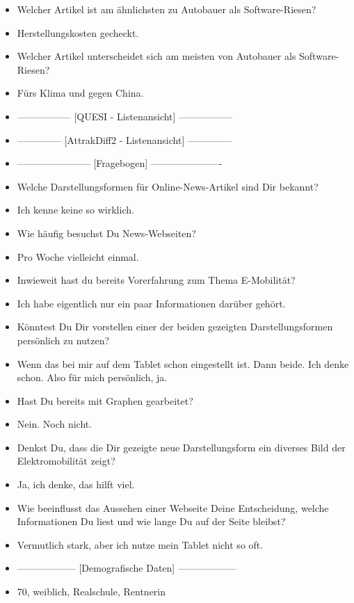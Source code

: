 {\begin{itemize}[]
        \item {} Welcher Artikel ist am ähnlichsten zu \flqq Autobauer als Software-Riesen\frqq{}?
        \item {} \flqq Herstellungskosten gecheckt\frqq{}.
        \item {} Welcher Artikel unterscheidet sich am meisten von \flqq Autobauer als Software-Riesen\frqq{}?
        \item {} \flqq Fürs Klima und gegen China\frqq{}.
        \item {-----------------} [QUESI - Listenansicht] {-----------------}
        \item {--------------} [AttrakDiff2 - Listenansicht] {--------------}
        \item {-----------------------} [Fragebogen] {----------------------}
        \item {} Welche Darstellungsformen für Online-News-Artikel sind Dir bekannt?
        \item {} Ich kenne keine so wirklich.
        \item {} Wie häufig besuchst Du News-Webseiten?
        \item {} Pro Woche vielleicht einmal.
        \item {} Inwieweit hast du bereits Vorerfahrung zum Thema E-Mobilität?
        \item {} Ich habe eigentlich nur ein paar Informationen darüber gehört.
        \item {} Könntest Du Dir vorstellen einer der beiden gezeigten Darstellungsformen persönlich zu nutzen?
        \item {} Wenn das bei mir auf dem Tablet schon eingestellt ist.
              Dann beide.
              Ich denke schon.
              Also für mich persönlich, ja.
        \item {} Hast Du bereits mit Graphen gearbeitet?
        \item {} Nein. Noch nicht.
        \item {} Denkst Du, dass die Dir gezeigte neue Darstellungsform ein diverses Bild der Elektromobilität zeigt?
        \item {} Ja, ich denke, das hilft viel.
        \item {} Wie beeinflusst das Aussehen einer Webseite Deine Entscheidung, welche Informationen Du liest und wie lange Du auf der Seite bleibst?
        \item {} Vermutlich stark, aber ich nutze mein Tablet nicht so oft.
        \item {------------------} [Demografische Daten] {------------------}
        \item {} 70, weiblich, Realschule, Rentnerin
    \end{itemize}}
\nolinenumbers
